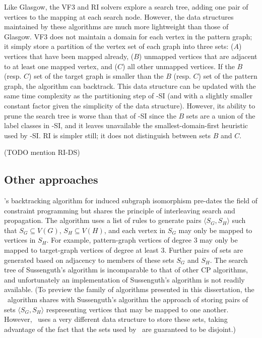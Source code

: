 Like Glasgow, the VF3 \citep{DBLP:journals/pami/CarlettiFSV18} and RI
\citep{DBLP:journals/bmcbi/BonniciGPSF13,DBLP:journals/tcbb/BonniciG17}
solvers explore a search tree, adding one pair of vertices to the mapping at each
search node.  However, the data structures maintained by these algorithms are
much more lightweight than those of Glasgow.  VF3 does not maintain
a domain for each vertex in the pattern graph; it simply store a partition
of the vertex set of each graph into three sets: ($A$) vertices that have been
mapped already, ($B$) unmapped vertices that are adjacent to at least one mapped vertex, and
($C$) all other unmapped vertices.
If the $B$ (resp. $C$) set of the target graph is smaller than the $B$ (resp. $C$)
set of the pattern graph, the algorithm can backtrack.
This data structure can be updated with the same
time complexity as the partitioning step of \McSplit-SI (and with a slightly
smaller constant factor given the simplicity of the data structure).  
However, its ability to prune the search tree is worse than that of \McSplit-SI
since the $B$ sets are a union of the label classes in \McSplit-SI, and it
leaves unavailable the smallest-domain-first heuristic used by \McSplit-SI.
RI is simpler still; it does not distinguish between sets $B$ and $C$.

(TODO mention RI-DS)

\subsection{Other approaches}\label{subsec:other-approaches-sip}

\citet{sussenguth1965graph}'s backtracking algorithm for induced subgraph
isomorphism pre-dates the field of constraint programming but shares the
principle of interleaving search and propagation.  The algorithm uses
a list of rules to generate
pairs $\langle S_G, S_H \rangle$ such that $S_G \subseteq V(G)$, $S_H \subseteq
V(H)$, and each vertex in $S_G$ may only be mapped to vertices in $S_H$.
For example, pattern-graph vertices of degree 3 may only be mapped to
target-graph vertices of degree at least 3.
Further pairs of sets are generated based on adjacency to
members of these sets $S_G$ and $S_H$.
The search tree of Sussenguth's algorithm is incomparable to that of
other CP algorithms, and unfortunately an implementation of Sussenguth's
algorithm is not readily available.
(To preview the family of algorithms
presented in this dissertation, the \McSplit\ algorithm shares with
Sussenguth's algorithm the approach of storing pairs of sets $\langle S_G, S_H
\rangle$ respresenting vertices that may be mapped to one another. However,
\McSplit\ uses a very different data structure to store these sets, taking
advantage of the fact that the sets used by \McSplit\ are guaranteed to be
disjoint.)

